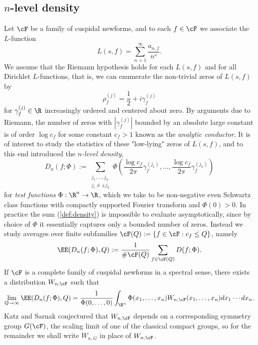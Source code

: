 \subsection{$n$-level density}

Let $\cF$ be a family of cuspidal newforms, and to each $f \in \cF$ we associate the $L$-function 
    \[ L(s, f) = \sum_{n = 1}^\infty \frac{a_{n, f}}{n^s}. \]
We assume that the Riemann hypothesis holds for each $L(s, f)$ and for all Dirichlet $L$-functions, that is, we can enumerate the non-trivial zeros of $L(s, f)$ by 
    \[ \rho^{(j)}_f = \frac12 + i \gamma_f^{(j)} \]
for $\gamma_f^{(j)} \in \R$ increasingly ordered and centered about zero. By arguments due to Riemann, the number of zeros with $|\gamma_f^{(j)}|$ bounded by an absolute large constant is of order $\log c_f$ for some constant $c_f > 1$ known as the \emph{analytic conductor}. It is of interest to study the statistics of these "low-lying" zeros of $L(s, f)$, and to this end \cite{ILS} introduced the \emph{$n$-level density},
\begin{equation}
    D_n (f; \Phi) := \sum_{\substack{j_1, \dots, j_n \\ j_i \neq \pm j_k}} \Phi \left( \frac{\log c_f}{2\pi} \gamma_f^{(j_1)}, \dots, \frac{\log c_f}{2\pi} \gamma_f^{(j_n)} \right)	\label{def:density}
\end{equation}
for \emph{test functions} $\Phi: \R^n \to \R$, which we take to be non-negative even Schwartz class functions with compactly supported Fourier transform and $\Phi(0) > 0$. In practice the sum (\ref{def:density}) is impossible to evaluate asymptotically, since by choice of $\Phi$ it essentially captures only a bounded number of zeros. Instead we study averages over finite subfamilies $\cF (Q) := \{ f \in \cF : c_f \leq Q \}$, namely
\begin{equation} 
    \EE (D_n (f; \Phi), Q) := \frac{1}{\# \cF (Q)} \sum_{f \in \cF (Q)} D(f; \Phi).
\end{equation}
If $\cF$ is a complete family of cuspidal newforms in a spectral sense, there exists a distribution $W_{n, \cF}$ such that 
\begin{equation}
    \lim_{Q \to \infty} \EE (D_n (f; \Phi), Q) = \frac{1}{\Phi(0, \dots, 0)} \int_{\R^n} \Phi(x_1, \dots, x_n) W_{n, \cF} (x_1, \dots, x_n) dx_1 \cdots dx_n.
\end{equation}
Katz and Sarnak conjectured that $W_{n, \cF}$ depends on a corresponding symmetry group $G(\cF)$, the scaling limit of one of the classical compact groups, so for the remainder we shall write $W_{n, G}$ in place of $W_{n, \cF}$. 

